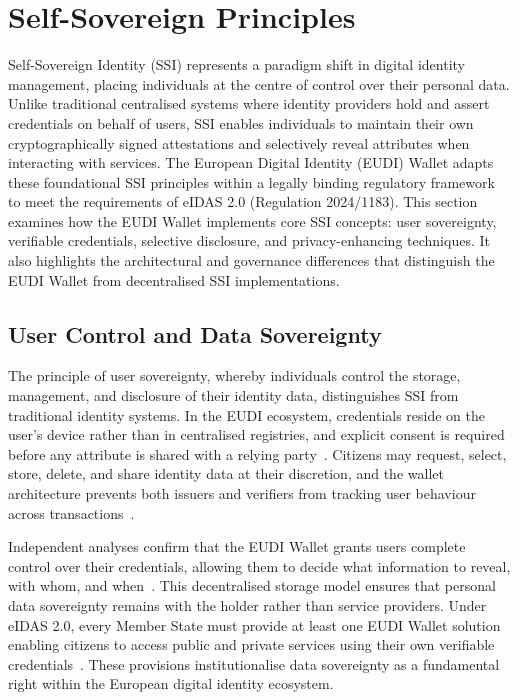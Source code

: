 \documentclass[sigconf,balance,nonacm,authordraft]{acmart}
\begin{document}
\section{Self-Sovereign Principles}
\label{sec:ssi}

Self-Sovereign Identity (SSI) represents a paradigm shift in digital identity management, placing individuals at the centre of control over their personal data. Unlike traditional centralised systems where identity providers hold and assert credentials on behalf of users, SSI enables individuals to maintain their own cryptographically signed attestations and selectively reveal attributes when interacting with services. The European Digital Identity (EUDI) Wallet adapts these foundational SSI principles within a legally binding regulatory framework to meet the requirements of eIDAS 2.0 (Regulation 2024/1183). This section examines how the EUDI Wallet implements core SSI concepts: user sovereignty, verifiable credentials, selective disclosure, and privacy-enhancing techniques. It also highlights the architectural and governance differences that distinguish the EUDI Wallet from decentralised SSI implementations.

\subsection{User Control and Data Sovereignty}

The principle of user sovereignty, whereby individuals control the storage, management, and disclosure of their identity data, distinguishes SSI from traditional identity systems. In the EUDI ecosystem, credentials reside on the user's device rather than in centralised registries, and explicit consent is required before any attribute is shared with a relying party~\cite{ZKPDiscussion_Recital15,ZKPDiscussion_Article5a}. Citizens may request, select, store, delete, and share identity data at their discretion, and the wallet architecture prevents both issuers and verifiers from tracking user behaviour across transactions~\cite{ZKPDiscussion_Article5a}. 

Independent analyses confirm that the EUDI Wallet grants users complete control over their credentials, allowing them to decide what information to reveal, with whom, and when~\cite{Gataca_ARF_SSI,ISC2_PrivacyDataSovereignty}. This decentralised storage model ensures that personal data sovereignty remains with the holder rather than service providers. Under eIDAS 2.0, every Member State must provide at least one EUDI Wallet solution enabling citizens to access public and private services using their own verifiable credentials~\cite{PortoThesis_Requirements}. These provisions institutionalise data sovereignty as a fundamental right within the European digital identity ecosystem.
\end{document}
